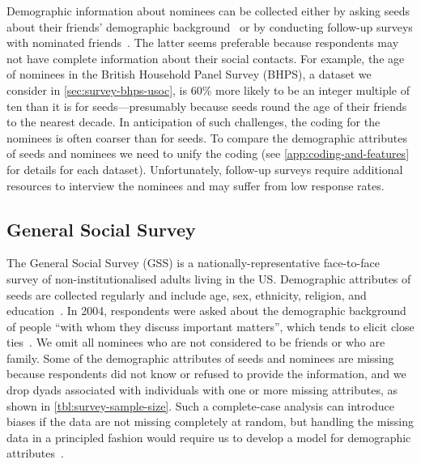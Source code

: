 \documentclass{scrartcl}
\begin{document}
Demographic information about nominees can be collected either by asking seeds about their friends' demographic background~\cite{Marsden1987,McPherson2006} or by conducting follow-up surveys with nominated friends~\cite{Johnson1989}. The latter seems preferable because respondents may not have complete information about their social contacts. For example, the age of nominees in the British Household Panel Survey (BHPS), a dataset we consider in \cref{sec:survey-bhps-usoc}, is 60\% more likely to be an integer multiple of ten than it is for seeds---presumably because seeds round the age of their friends to the nearest decade. In anticipation of such challenges, the coding for the nominees is often coarser than for seeds. To compare the demographic attributes of seeds and nominees we need to unify the coding (see \cref{app:coding-and-features} for details for each dataset). Unfortunately, follow-up surveys require additional resources to interview the nominees and may suffer from low response rates.

\subsection{General Social Survey\label{sec:survey-gss}}

The General Social Survey (GSS) is a nationally-representative face-to-face survey of non-institutionalised adults living in the US. Demographic attributes of seeds are collected regularly and include age, sex, ethnicity, religion, and education~\cite{Marsden1987,Marsden1988}. In 2004, respondents were asked about the demographic background of people ``with whom they discuss important matters'', which tends to elicit close ties~\cite{Marin2004}. We omit all nominees who are not considered to be friends or who are family. Some of the demographic attributes of seeds and nominees are missing because respondents did not know or refused to provide the information, and we drop dyads associated with individuals with one or more missing attributes, as shown in \cref{tbl:survey-sample-size}. Such a complete-case analysis can introduce biases if the data are not missing completely at random, but handling the missing data in a principled fashion would require us to develop a model for demographic attributes~\cite{Pigott2001}.
\end{document}
